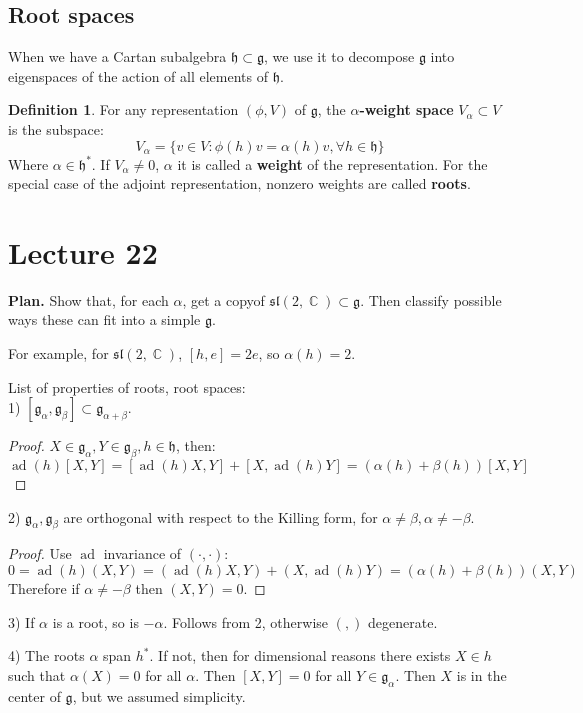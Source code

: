 \documentclass[12 pt]{article}
\DeclareMathOperator {\C} {\mathbb{C}}
\DeclareMathOperator {\ad} {ad}
\theoremstyle{plain}
\theoremstyle{definition}
\newtheorem{defn}{Definition}
\theoremstyle{remark}
\begin{document}
\subsection*{Root spaces}
When we have a Cartan subalgebra $\mathfrak{h} \subset \mathfrak{g}$, we use it to decompose $\mathfrak{g}$ into eigenspaces of the action of all elements of $\mathfrak{h}$.
\begin{defn}
For any representation $(\phi, V)$ of $\mathfrak{g}$, the \textbf{$\alpha$-weight space} $V_{\alpha} \subset V$ is the subspace:
\[       V_{\alpha} = \{  v \in V : \phi(h) v = \alpha(h) v, \forall h \in \mathfrak{h}  \}     \]
Where $\alpha \in \mathfrak{h}^*$. If $V_{\alpha} \neq 0$, $\alpha$ it is called a \textbf{weight} of the representation. For the special case of the adjoint representation, nonzero weights are called \textbf{roots}.
\end{defn}



\section*{Lecture 22}
\textbf{Plan.} Show that, for each $\alpha$, get a copyof $\mathfrak{sl}(2,\C) \subset \mathfrak{g}$. Then classify possible ways these can fit into a simple $\mathfrak{g}$.

For example, for $\mathfrak{sl}(2,\C)$, $[h,e] = 2e$, so $\alpha(h) = 2$.

List of properties of roots, root spaces:
\\
1) $[\mathfrak{g}_{\alpha}, \mathfrak{g}_{\beta} ] \subset \mathfrak{g}_{\alpha + \beta}$. 
\begin{proof}
$X \in \mathfrak{g}_{\alpha} , Y \in \mathfrak{g}_{\beta}, h \in \mathfrak{h}$, then:
\[       \ad(h)[X,Y] = [\ad(h) X, Y] + [X, \ad(h) Y] = (\alpha(h) + \beta(h) ) [X,Y]     \]
\end{proof}
2) $\mathfrak{g}_{\alpha}, \mathfrak{g}_{\beta}$ are orthogonal with respect to the Killing form, for $\alpha \neq \beta, \alpha \neq - \beta$.
\begin{proof}
Use $\ad$ invariance of $( \cdot , \cdot )$:
\[    0 = \ad(h) (X, Y) = (\ad(h) X, Y) + (X, \ad(h) Y) = (\alpha(h) + \beta(h))(X,Y)     \]
Therefore if $\alpha \neq - \beta$ then $(X,Y) = 0$.
\end{proof}
3) If $\alpha$ is a root, so is $-\alpha$. Follows from 2, otherwise $(,)$ degenerate.

4) The roots $\alpha$ span $h^*$. If not, then for dimensional reasons there exists $X \in h$ such that $\alpha(X) = 0$ for all $\alpha$. Then $[X,Y] = 0$ for all $Y \in \mathfrak{g}_{\alpha}$. Then $X$ is in the center of $\mathfrak{g}$, but we assumed simplicity.
\end{document}
